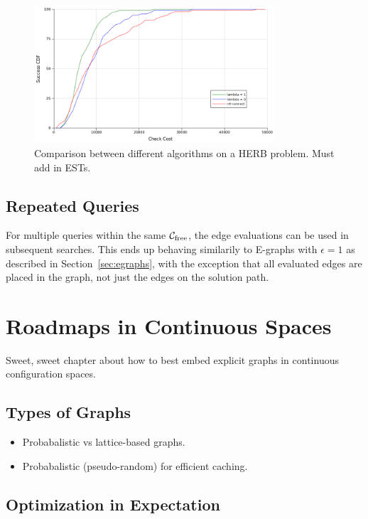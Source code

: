 \documentclass{report}
\begin{document}
\begin{figure}
\centering
\includegraphics[width=0.8\textwidth]{figs/timegreedy-herbstep1-comparison-cdfs.png}
\caption{Comparison between different algorithms on a HERB problem.
   Must add in ESTs.}
\label{fig:herb-comparison-cdfs}
\end{figure}

\section{Repeated Queries}

For multiple queries within the same
$\mathcal{C}_{\mbox{\scriptsize free}}$,
the edge evaluations can be used in subsequent searches.
This ends up behaving similarily to E-graphs \cite{phillips2012egraphs}
with $\epsilon=1$
as described in Section~\ref{sec:egraphs},
with the exception that all evaluated edges are placed in the graph,
not just the edges on the solution path.


\newpage
\chapter{Roadmaps in Continuous Spaces}
\label{chap:graphs-in-continuous}

Sweet, sweet chapter about how to best embed explicit graphs
in continuous configuration spaces.

\section{Types of Graphs}

\begin{itemize}
\item Probabalistic vs lattice-based graphs.
\item Probabalistic (pseudo-random) for efficient caching.
\end{itemize}

\section{Optimization in Expectation}
\end{document}
